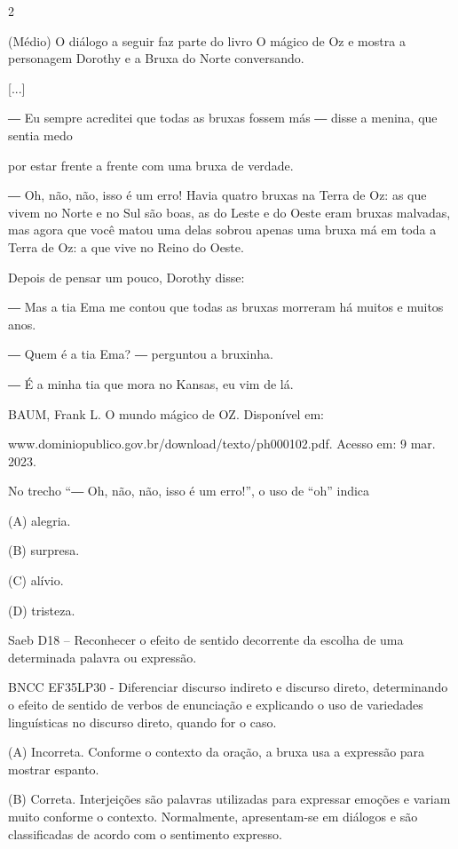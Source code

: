 \begin{itemize}
{{{\begin{itemize}
\begin{itemize}
\begin{itemize}
\num{2}

(Médio) O diálogo a seguir faz parte do livro O mágico de Oz e mostra a
personagem Dorothy e a Bruxa do Norte conversando.

{[}...{]}

― Eu sempre acreditei que todas as bruxas fossem más ― disse a menina,
que sentia medo

por estar frente a frente com uma bruxa de verdade.

― Oh, não, não, isso é um erro! Havia quatro bruxas na Terra de Oz: as
que vivem no Norte e no Sul são boas, as do Leste e do Oeste eram bruxas
malvadas, mas agora que você matou uma delas sobrou apenas uma bruxa má
em toda a Terra de Oz: a que vive no Reino do Oeste.

Depois de pensar um pouco, Dorothy disse:

― Mas a tia Ema me contou que todas as bruxas morreram há muitos e
muitos anos.

― Quem é a tia Ema? ― perguntou a bruxinha.

― É a minha tia que mora no Kansas, eu vim de lá.

BAUM, Frank L. O mundo mágico de OZ. Disponível em:

www.dominiopublico.gov.br/download/texto/ph000102.pdf. Acesso em: 9 mar.
2023.

No trecho ``― Oh, não, não, isso é um erro!'', o uso de ``oh'' indica

\protect\hypertarget{_Hlk129264408}{}{\protect\hypertarget{_Hlk127859316}{}{}}(A)
alegria.

(B) surpresa.

(C) alívio.

(D) tristeza.

\protect\hypertarget{_Hlk129264511}{}{}Saeb D18 -- Reconhecer o efeito
de sentido decorrente da escolha de uma determinada palavra ou
expressão.

BNCC EF35LP30 - Diferenciar discurso indireto e discurso direto,
determinando o efeito de sentido de verbos de enunciação e explicando o
uso de variedades linguísticas no discurso direto, quando for o caso.

(A) Incorreta. Conforme o contexto da oração, a bruxa usa a expressão
para mostrar espanto.

(B) Correta. Interjeições são palavras utilizadas para expressar emoções
e variam muito conforme o contexto. Normalmente, apresentam-se em
diálogos e são classificadas de acordo com o sentimento expresso.


\end{itemize}
\end{itemize}
\end{itemize}}}}
\end{itemize}
